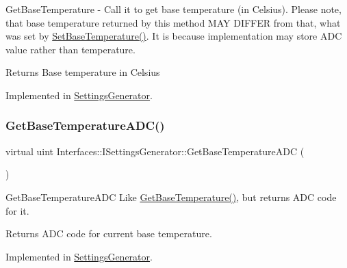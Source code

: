 Get\+Base\+Temperature -\/ Call it to get base temperature (in Celsius). Please note, that base temperature returned by this method M\+AY D\+I\+F\+F\+ER from that, what was set by \hyperlink{class_interfaces_1_1_i_settings_generator_a8b60ba05790994db0303b251f655e95d}{Set\+Base\+Temperature()}. It is because implementation may store A\+DC value rather than temperature. 

\begin{DoxyReturn}{Returns}
Base temperature in Celsius 
\end{DoxyReturn}


Implemented in \hyperlink{class_settings_generator_a80b1ff8060a16d149989d98a88ab253e}{Settings\+Generator}.

\mbox{\label{class_interfaces_1_1_i_settings_generator_a1000ff41c6eecdb55a46c859ca0ebe67}} 
\subsubsection{\texorpdfstring{Get\+Base\+Temperature\+A\+D\+C()}{GetBaseTemperatureADC()}}
{\footnotesize\ttfamily virtual uint Interfaces\+::\+I\+Settings\+Generator\+::\+Get\+Base\+Temperature\+A\+DC (\begin{DoxyParamCaption}{ }\end{DoxyParamCaption})\hspace{0.3cm}{\ttfamily [pure virtual]}}



Get\+Base\+Temperature\+A\+DC Like \hyperlink{class_interfaces_1_1_i_settings_generator_a9cc36185b446f21e09a0e5633f39a1c5}{Get\+Base\+Temperature()}, but returns A\+DC code for it. 

\begin{DoxyReturn}{Returns}
A\+DC code for current base temperature. 
\end{DoxyReturn}


Implemented in \hyperlink{class_settings_generator_a5f3f78597f001c127b89f6447a46df09}{Settings\+Generator}.

\mbox{\label{class_interfaces_1_1_i_settings_generator_af1b65a18c3ade3235715ae2e9cdbcfe0}} 
